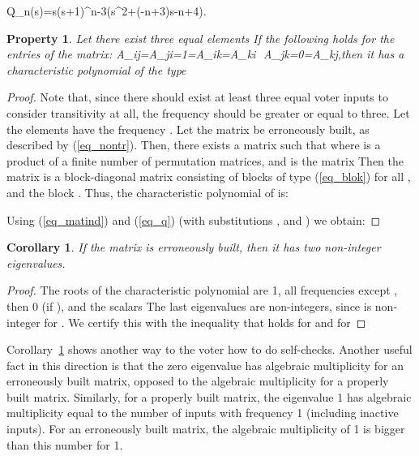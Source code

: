 \documentclass[technote, a4paper, onecolumn]{IEEEtran}  \newcommand{\avtor}{Aleksandar Simevski}
\newtheorem{property}{Property}
\newtheorem{corollary}{Corollary}
\begin{document}
\be\label{eq_q} Q_n(s)=s(s+1)^{n-3}(s^2+(-n+3)s-n+4).\ee



\medskip
\begin{property}\label{theo_nontransitivity}
Let there exist three equal elements  If the following holds for the entries of the  matrix:
\be\label{eq_nontr}
A_{ij}=A_{ji}=1=A_{ik}=A_{ki}\,\wedge\, A_{jk}=0=A_{kj},\ee then it has a characteristic polynomial of the type

\end{property}

\begin{proof}\label{proof_nontransitivity}
Note that, since there should exist at least three equal voter inputs to consider transitivity at all, the frequency  should be greater or equal to three. Let the elements  have the frequency . Let the   matrix be erroneously
built, as described by (\ref{eq_nontr}). Then, there
exists a  matrix such that
 where  is a product of a finite number of permutation matrices,  and  is the  matrix
  Then the matrix  is a block-diagonal matrix
consisting  of blocks of type (\ref{eq_blok}) for all , and the  block . Thus, the
characteristic polynomial of  is:

Using (\ref{eq_matind}) and (\ref{eq_q}) (with substitutions , and  ) we obtain:

\end{proof}

\medskip
\begin{corollary}\label{cor_notnat} If the  matrix is erroneously built, then it has two non-integer eigenvalues.\end{corollary}

\begin{proof}
The roots of the characteristic polynomial are  1, all frequencies except ,  then 0 (if ), and the scalars  The last eigenvalues are non-integers, since  is non-integer for . We certify this with the inequality  that holds for  and  for 
\end{proof}

\medskip
Corollary~\ref{cor_notnat}  shows another way to  the voter how to do self-checks. Another useful fact in this direction is that the zero eigenvalue has algebraic multiplicity  for an erroneously built matrix, opposed to the algebraic multiplicity  for a properly built matrix. Similarly, for a properly built matrix, the eigenvalue 1 has algebraic multiplicity equal to the number of inputs with frequency 1 (including inactive inputs). For an erroneously built matrix, the algebraic multiplicity of 1 is bigger than this number for 1.
\end{document}

